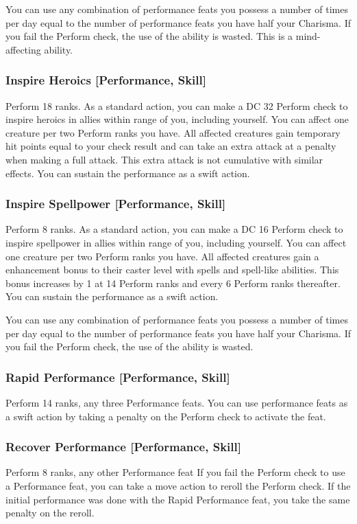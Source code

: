 You can use any combination of performance feats you possess a number of times per day equal to the number of performance feats you have \add half your Charisma. If you fail the Perform check, the use of the ability is wasted. This is a mind-affecting ability.

\subsubsection{Inspire Heroics [Performance, Skill]}
\featpre Perform 18 ranks.
\featben As a standard action, you can make a DC 32 Perform check to inspire heroics in allies within \rngmed range of you, including yourself. You can affect one creature per two Perform ranks you have. All affected creatures gain temporary hit points equal to your check result and can take an extra attack at a  penalty when making a full attack. This extra attack is not cumulative with similar effects. You can sustain the performance as a swift action.

\subsubsection{Inspire Spellpower [Performance, Skill]}
\featpre Perform 8 ranks.
\featben As a standard action, you can make a DC 16 Perform check to inspire spellpower in allies within \rngmed range of you, including yourself. You can affect one creature per two Perform ranks you have. All affected creatures gain a  enhancement bonus to their caster level with spells and spell-like abilities. This bonus increases by 1 at 14 Perform ranks and every 6 Perform ranks thereafter. You can sustain the performance as a swift action.

You can use any combination of performance feats you possess a number of times per day equal to the number of performance feats you have \add half your Charisma. If you fail the Perform check, the use of the ability is wasted.

\subsubsection{Rapid Performance [Performance, Skill]}
\featpre Perform 14 ranks, any three Performance feats.
\featben You can use performance feats as a swift action by taking a  penalty on the Perform check to activate the feat.

\subsubsection{Recover Performance [Performance, Skill]}
\featpre Perform 8 ranks, any other Performance feat
\featben If you fail the Perform check to use a Performance feat, you can take a move action to reroll the Perform check. If the initial performance was done with the Rapid Performance feat, you take the same  penalty on the reroll.

